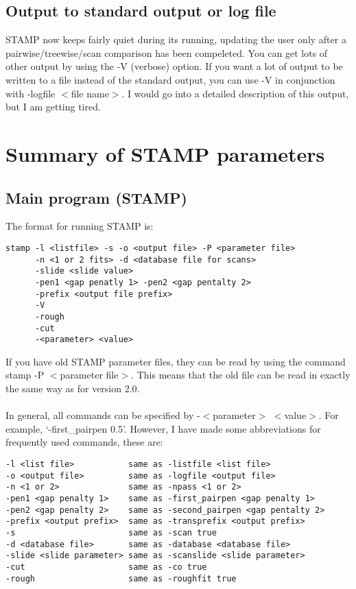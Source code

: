 \section{Output to standard output or log file}

STAMP now keeps fairly quiet during its running, updating the user only
after a pairwise/treewise/scan comparison has been compeleted.  You can
get lots of other output by using the -V (verbose) option.  If you want a lot of
output to be written to a file instead of the standard output, you 
can use -V in conjunction with -logfile $<$file name$>$.   I would go into
a detailed description of this output, but I am getting tired.

\chapter{Summary of STAMP parameters}

\section{Main program (STAMP)}

The format for running STAMP is:

\begin{scriptsize}\begin{verbatim}
stamp -l <listfile> -s -o <output file> -P <parameter file>
      -n <1 or 2 fits> -d <database file for scans> 
      -slide <slide value>
      -pen1 <gap penatly 1> -pen2 <gap pentalty 2> 
      -prefix <output file prefix>
      -V
      -rough 
      -cut
      -<parameter> <value>
\end{verbatim} \end{scriptsize}

If you have old STAMP parameter files, they can be read by using
the command stamp -P $<$parameter file$>$.  This means that the old
file can be read in exactly the same way as for version 2.0.\\
\\
In general, all commands can be specified by -$<$parameter$>$ $<$value$>$.
For example, `-first\_pairpen 0.5'.  However, I have made some
abbreviations for frequently used commands, these are:

\begin{scriptsize}\begin{verbatim}
-l <list file>           same as -listfile <list file>
-o <output file>         same as -logfile <output file>
-n <1 or 2>              same as -npass <1 or 2>
-pen1 <gap penalty 1>    same as -first_pairpen <gap penalty 1>
-pen2 <gap penalty 2>    same as -second_pairpen <gap pentalty 2>
-prefix <output prefix>  same as -transprefix <output prefix>
-s                       same as -scan true
-d <database file>       same as -database <database file>
-slide <slide parameter> same as -scanslide <slide parameter>
-cut                     same as -co true 
-rough                   same as -roughfit true
\end{verbatim} \end{scriptsize}

